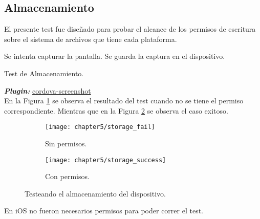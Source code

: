 \subsection{Almacenamiento}
El presente test fue diseñado para probar el alcance de los permisos de escritura sobre el sistema de archivos que tiene cada plataforma.\\
\begin{algorithm}
	\begin{algorithmic}[1]
		\STATE Se intenta capturar la pantalla.
		\STATE Se guarda la captura en el dispositivo.
		
	\end{algorithmic}
	\caption{Test de Almacenamiento.}\label{alg:chap5_test_storage}
\end{algorithm}
\textbf{\emph{Plugin:}} \href{https://github.com/gitawego/cordova-screenshot}{cordova-screenshot}\\
En la Figura \ref{fig:ch05:storage_fail} se observa el resultado del test cuando no se tiene el permiso correspondiente. Mientras que en la Figura \ref{fig:ch05:storage_success} se observa el caso exitoso.\\
\begin{figure}[hbtp]
   \centering
   	\begin{subfigure}{.3\linewidth}
		\texttt{[image: chapter5/storage\_fail]}
		\caption{Sin permisos.}
		\label{fig:ch05:storage_fail}
	\end{subfigure}
	\begin{subfigure}{.3\linewidth}
		\texttt{[image: chapter5/storage\_success]}
		\caption{Con permisos.}
		\label{fig:ch05:storage_success}
	\end{subfigure}
	\caption{Testeando el almacenamiento del dispositivo.}
	\label{fig:ch05:storage_test}
\end{figure}
En iOS no fueron necesarios permisos para poder correr el test.


